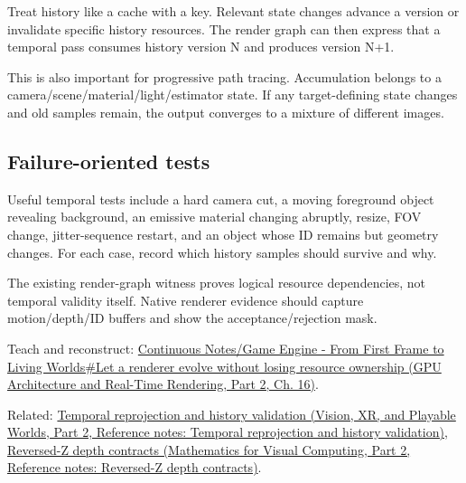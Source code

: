 \hypertarget{appendix-2e7e9fd28a2c-versioned-history}{}

Treat history like a cache with a key. Relevant state changes advance a version or invalidate specific history resources. The render graph can then express that a temporal pass consumes history version N and produces version N+1.

This is also important for progressive path tracing. Accumulation belongs to a camera/scene/material/light/estimator state. If any target-defining state changes and old samples remain, the output converges to a mixture of different images.

\subsection{Failure-oriented tests}\label{appendix-2e7e9fd28a2c-failure-oriented-tests}

\hypertarget{appendix-2e7e9fd28a2c-failure-oriented-tests}{}

Useful temporal tests include a hard camera cut, a moving foreground object revealing background, an emissive material changing abruptly, resize, FOV change, jitter-sequence restart, and an object whose ID remains but geometry changes. For each case, record which history samples should survive and why.

The existing render-graph witness proves logical resource dependencies, not temporal validity itself. Native renderer evidence should capture motion/depth/ID buffers and show the acceptance/rejection mask.

Teach and reconstruct: \href{../06-GPU-Architecture-and-Real-Time-Rendering-P02/main.pdf\#nameddest=06-engine-ii-ch025-let-a-renderer-evolve-without-losing-resource-ownership}{Continuous Notes/Game Engine - From First Frame to Living Worlds\#Let a renderer evolve without losing resource ownership (GPU Architecture and Real-Time Rendering, Part 2, Ch. 16)}.

Related: \href{../07-Vision-XR-and-Playable-Worlds-P02/main.pdf\#nameddest=appendix-0727340a4428}{Temporal reprojection and history validation (Vision, XR, and Playable Worlds, Part 2, Reference notes: Temporal reprojection and history validation)}, \href{../02-Mathematics-for-Visual-Computing-P02/main.pdf\#nameddest=appendix-275ec8847057}{Reversed-Z depth contracts (Mathematics for Visual Computing, Part 2, Reference notes: Reversed-Z depth contracts)}.

